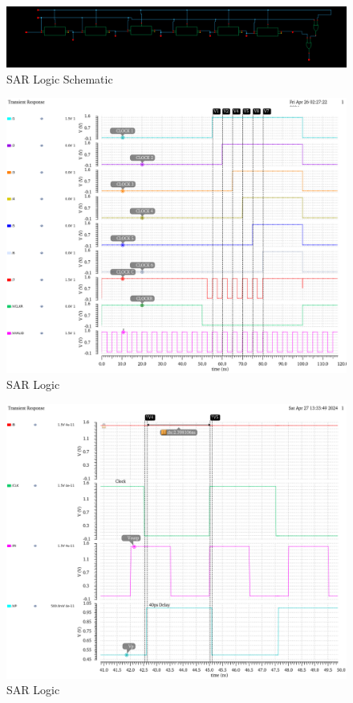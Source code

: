 \documentclass[a4paper,12pt]{article}
\begin{document}
\begin{figure}[H]
    \centering
    \includegraphics[max width = \textwidth]{3/3_sch_sarlogic.png}
    \caption{SAR Logic Schematic}
    \label{fig:enter-label}
\end{figure}


\begin{figure}[H]
    \centering
    \includegraphics[max width = \textwidth]{3/3_SAR_LOGIC.png}
    \caption{SAR Logic}
    \label{fig:enter-label}
\end{figure}

\begin{figure}[H]
    \centering
    \includegraphics[max width = \textwidth]{3/3_CNTRL_LOGIC_C.png}
    \caption{SAR Logic}
    \label{fig:enter-label}
\end{figure}
\end{document}
